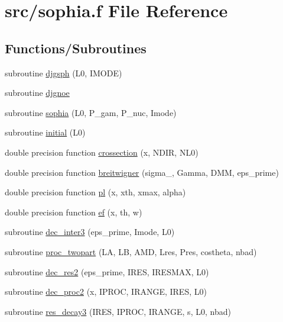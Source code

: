 \hypertarget{sophia_8f}{}\section{src/sophia.f File Reference}
\label{sophia_8f}
\subsection*{Functions/\+Subroutines}
\begin{DoxyCompactItemize}
\item 
subroutine \hyperlink{sophia_8f_abe318bfad781fc9eb048ee5ee8b30827}{djgsph} (L0, I\+M\+O\+DE)
\item 
subroutine \hyperlink{sophia_8f_abf05c3377851b60a996934fb64c95b40}{djgnoe}
\item 
subroutine \hyperlink{sophia_8f_a24c50b70b50ec9f086d000cbb6b29c45}{sophia} (L0, P\+\_\+gam, P\+\_\+nuc, Imode)
\item 
subroutine \hyperlink{sophia_8f_a8043d12e12d2dca411a957f5e6faa35d}{initial} (L0)
\item 
double precision function \hyperlink{sophia_8f_ad14b0ac258699da8b9e12c8a4704bbcd}{crossection} (x, N\+D\+IR, N\+L0)
\item 
double precision function \hyperlink{sophia_8f_ae462dd618b46569b99e29cf52b615206}{breitwigner} (sigma\+\_, Gamma, D\+MM, eps\+\_\+prime)
\item 
double precision function \hyperlink{sophia_8f_a6c34da18942ed8ac849df1d06a2b9c6c}{pl} (x, xth, xmax, alpha)
\item 
double precision function \hyperlink{sophia_8f_a7e32b615d6a5eec59e547bc1d23c7926}{ef} (x, th, w)
\item 
subroutine \hyperlink{sophia_8f_a715d45a0bca6b97f99f062111397824a}{dec\+\_\+inter3} (eps\+\_\+prime, Imode, L0)
\item 
subroutine \hyperlink{sophia_8f_aa3ed293aaa5a3ef80078169868a3569e}{proc\+\_\+twopart} (LA, LB, A\+MD, Lres, Pres, costheta, nbad)
\item 
subroutine \hyperlink{sophia_8f_a1f10866338ba407c5a39963ea43afc6e}{dec\+\_\+res2} (eps\+\_\+prime, I\+R\+ES, I\+R\+E\+S\+M\+AX, L0)
\item 
subroutine \hyperlink{sophia_8f_aa3b0701079e090328e78a236c355785c}{dec\+\_\+proc2} (x, I\+P\+R\+OC, I\+R\+A\+N\+GE, I\+R\+ES, L0)
\item 
subroutine \hyperlink{sophia_8f_afdb8624294bb5ad954b4b204506af2ae}{res\+\_\+decay3} (I\+R\+ES, I\+P\+R\+OC, I\+R\+A\+N\+GE, s, L0, nbad)

\end{DoxyCompactItemize}
